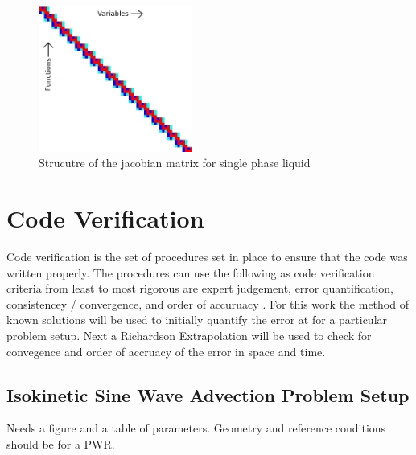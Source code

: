 \documentclass{mc2015}
\begin{document}
    \begin{figure}[!h]
    	\centering
    	\includegraphics[width=0.45\textwidth]{images/Jacobian_Setup}
    	\caption{Strucutre of the jacobian matrix for single phase liquid}
    	\label{fig:Jacobian_Setup}
    \end{figure}

\section{Code Verification}

Code verification is the set of procedures set in place to ensure that the code
was written properly. The procedures can use the following as code verification
criteria from least to most rigorous are expert judgement, error quantification,
consistencey / convergence, and order of accuruacy \cite{VV_Book}. For this work
the method of known solutions will be used to initially quantify the error at
for a particular problem setup. Next a Richardson Extrapolation will be used to
check for convegence and order of accruacy of the error in space and time.
 



\subsection{Isokinetic Sine Wave Advection Problem Setup}

Needs a figure and a table of parameters. Geometry and reference conditions
should be for a PWR.
\end{document}
